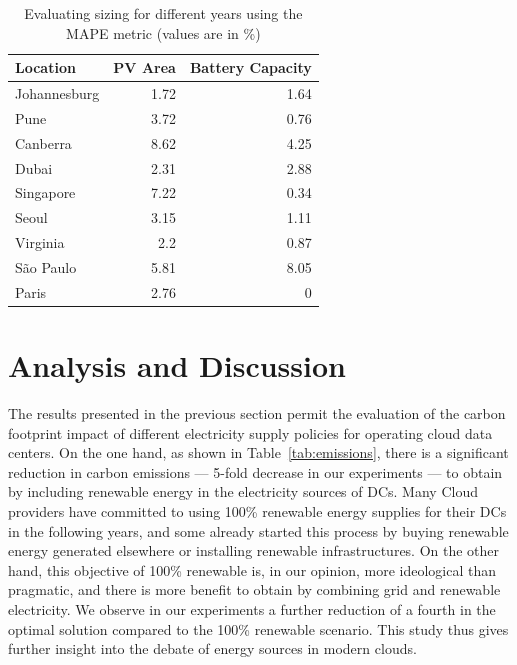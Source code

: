 \begin{table}[!ht]
  
  \caption{Evaluating sizing for different years using the MAPE metric (values are in \%) }\label{tab:years_MAPE} \centering

  \begin{tabular}{|l|r|r|}
   \hline
    
  \textbf{Location} &   \textbf{PV Area} & \textbf{Battery Capacity} \\
  \hline
  Johannesburg & 1.72 & 1.64  \\
  \hline
  Pune  & 3.72 & 0.76  \\
  \hline
  Canberra  & 8.62 & 4.25 \\
  \hline
  Dubai   & 2.31 & 2.88   \\
  \hline
  Singapore & 7.22 & 0.34 \\
  \hline     
  Seoul    & 3.15 & 1.11 \\
  \hline
  Virginia   & 2.2 & 0.87 \\
  \hline
  São Paulo   & 5.81 & 8.05 \\
  \hline 
  Paris    & 2.76 & 0     \\
  \hline  

\end{tabular}  
\end{table}


\section{Analysis and Discussion}
\label{sec:analysis-discussion_ccgrid}



The results presented in the previous section permit the evaluation of the carbon footprint impact of different electricity supply policies for operating cloud data centers. On the one hand, as shown in Table~\ref{tab:emissions}, there is a significant reduction in carbon emissions --- 5-fold decrease in our experiments --- to obtain by including renewable energy in the electricity sources of DCs. Many Cloud providers have committed to using 100\% renewable energy supplies for their DCs in the following years, and some already started this process by buying renewable energy generated elsewhere or installing renewable infrastructures. On the other hand, this objective of 100\% renewable is, in our opinion, more ideological than pragmatic, and there is more benefit to obtain by combining grid and renewable electricity. We observe in our experiments a further reduction of a fourth in the optimal solution compared to the 100\% renewable scenario. This study thus gives further insight into the debate of energy sources in modern clouds.


